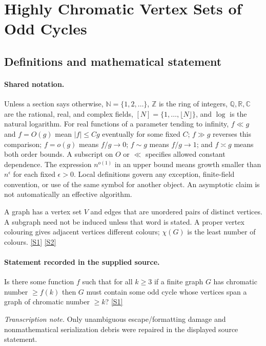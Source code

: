 \documentclass[11pt,a4paper]{article}
\newcommand{\N}{\mathbb{N}}
\newcommand{\Z}{\mathbb{Z}}
\newcommand{\Q}{\mathbb{Q}}
\newcommand{\R}{\mathbb{R}}
\newcommand{\C}{\mathbb{C}}
\newcommand{\sref}[2]{\hyperlink{source:#1:#2}{[S#2]}}
\begin{document}
\section{Highly Chromatic Vertex Sets of Odd Cycles}\label{statement}


\subsection{Definitions and mathematical statement}

\paragraph{Shared notation.}Unless a section says otherwise, $\N=\{1,2,\ldots\}$,
$\Z$ is the ring of integers, $\Q,\R,\C$ are the rational, real, and complex
fields, $[N]=\{1,\ldots,\lfloor N\rfloor\}$, and $\log$ is the natural
logarithm. For real functions of a parameter tending to infinity,
$f\ll g$ and $f=O(g)$ mean $|f|\leq Cg$ eventually for some fixed $C$;
$f\gg g$ reverses this comparison; $f=o(g)$ means $f/g\to0$;
$f\sim g$ means $f/g\to1$; and $f\asymp g$ means both order bounds.
A subscript on $O$ or $\ll$ specifies allowed constant dependence.
The expression $n^{o(1)}$ in an upper bound means growth smaller than
$n^\epsilon$ for each fixed $\epsilon>0$. Local definitions govern any
exception, finite-field convention, or use of the same symbol for another
object. An asymptotic claim is not automatically an effective algorithm.



A graph has a vertex set $V$ and edges that are unordered pairs of distinct vertices. A subgraph need not be induced unless that word is stated. A proper vertex colouring gives adjacent vertices different colours; $\chi(G)$ is the least number of colours. \sref{statement}{1} \sref{statement}{2}

\paragraph{Statement recorded in the supplied source.}
Is there some function $f$ such that for all $k\geq 3$ if a finite graph $G$ has chromatic number $\geq f(k)$ then $G$ must contain some odd cycle whose vertices span a graph of chromatic number $\geq k$? \sref{statement}{1}

{\small\emph{Transcription note.} Only unambiguous escape/formatting damage and nonmathematical serialization debris were repaired in the displayed source statement.}
\end{document}
